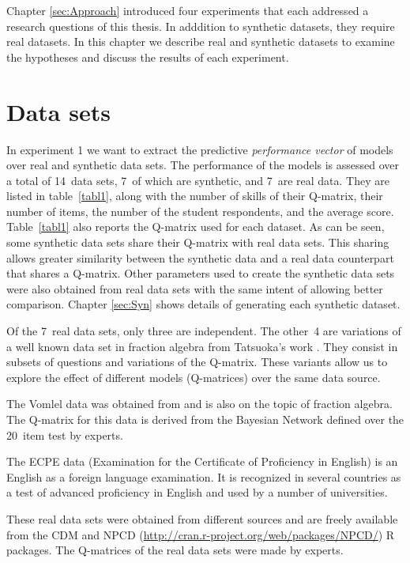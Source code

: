 \label{sec:SIGNATURE}

Chapter \ref{sec:Approach} introduced four experiments that each addressed a research questions of this thesis. In adddition to synthetic datasets, they require real datasets. In this chapter we describe real and synthetic datasets to examine the hypotheses and discuss the results of each experiment.

\section{Data sets}

In experiment 1 we want to extract the predictive \textit{performance vector} of models over real and synthetic data sets. The performance of the models is assessed over a total of 14~data sets, 7~of which are synthetic, and 7~are real data. They are listed in table~\ref{tabl1}, along with the number of skills of their Q-matrix, their number of items, the number of the student respondents, and the average score. Table~\ref{tabl1} also reports the Q-matrix used for each dataset. As can be seen, some synthetic data sets share their Q-matrix with real data sets. This sharing allows greater similarity between the synthetic data and a real data counterpart that shares a Q-matrix. Other parameters used to create the synthetic data sets were also obtained from real data sets with the same intent of allowing better comparison. Chapter \ref{sec:Syn} shows details of generating each synthetic dataset.

Of the 7~real data sets, only three are independent. The other~4 are variations of a well known data set in fraction algebra from Tatsuoka's work \citep{tatsuoka1984analysis}. They consist in subsets of questions and variations of the Q-matrix. These variants allow us to explore the effect of different models (Q-matrices) over the same data source.

The Vomlel data was obtained from \citep{vomlel:2004} and is also on the topic of fraction algebra. The Q-matrix for this data is derived from the Bayesian Network defined over the 20~item test by experts.

The ECPE data (Examination for the Certificate of Proficiency in English) is an English as a foreign language examination. It is recognized in several countries as a test of advanced proficiency in English and used by a number of universities.

These real data sets were obtained from different sources and are freely available from the CDM \citep{Robitzsch2012} and NPCD ({\url{http://cran.r-project.org/web/packages/NPCD/}}) R packages. The Q-matrices of the real data sets were made by experts.

